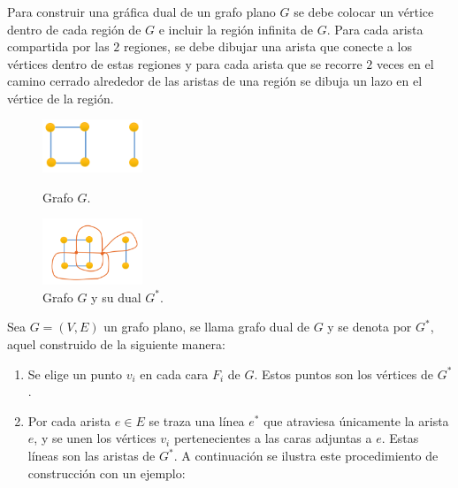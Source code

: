 \documentclass[spanish,utf8]{beamer}
\theoremstyle{definition}
\begin{document}
\begin{frame}[allowframebreaks]
\frametitle{\insertsubsection}

\begin{example}
Para construir una gráfica dual de un grafo plano $G$ se debe colocar un vértice dentro de cada región de $G$ e incluir la región infinita de $G$. Para cada arista compartida por las $2$ regiones, se debe dibujar una arista que conecte a los vértices dentro de estas regiones y para cada arista que se recorre $2$ veces en el camino cerrado alrededor de las aristas de una región se dibuja un lazo en el vértice de la región. 
\end{example}

\begin{figure}[H]
	\captionsetup{justification=centering,margin=0.5cm}
	\centering
	\begin{minipage}{.5\textwidth}
		\centering
		\includegraphics[width=3cm]{example1.png}
		\caption{Grafo $G$.}
	\end{minipage}%
	\begin{minipage}{0.5\textwidth}
		\centering
		\includegraphics[width=3cm]{example2.png}
		\caption{Grafo $G$ y su dual $G^{\ast}$.}
	\end{minipage}
\end{figure}

\begin{example}
Sea $G=(V,E)$ un grafo plano, se llama grafo dual de $G$ y se denota por $G^{\ast}$, aquel construido de la siguiente manera:

\begin{enumerate}
	\item Se elige un punto $v_i$ en cada cara $F_i$ de $G$. Estos puntos son los vértices de $G^{\ast}$.

	\item Por cada arista $e\in E$ se traza una línea $e^{\ast}$ que atraviesa únicamente la arista $e$, y se unen los vértices $v_i$ pertenecientes a las caras adjuntas a $e$. Estas líneas son las aristas de $G^{\ast}$. A continuación se ilustra este procedimiento de construcción con un ejemplo:
	\end{enumerate}
\end{example}


\end{frame}
\end{document}
